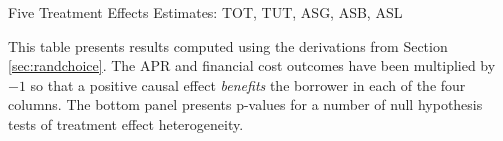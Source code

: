 \documentclass[12pt, a4paper]{article}
\begin{document}
\begin{table}[H]
\caption{Five Treatment Effects Estimates: TOT, TUT, ASG, ASB, ASL}
\label{tot_tut}
\begin{center}
\footnotesize{}
\end{center}
\scriptsize{This table presents results computed using the derivations from Section \ref{sec:randchoice}. The APR and financial cost outcomes have been multiplied by $-1$ so that a positive causal effect \emph{benefits} the borrower in each of the four columns. The bottom panel presents p-values for a number of null hypothesis tests of treatment effect heterogeneity. }
\end{table}







\end{document}
